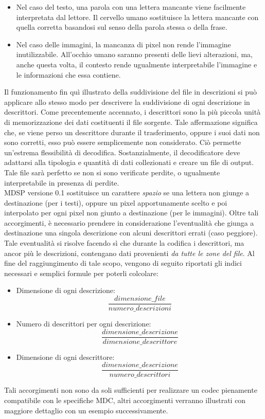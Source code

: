 \begin{itemize}
 \item Nel caso del testo, una parola con una lettera mancante viene facilmente interpretata dal lettore. Il cervello umano sostituisce la lettera mancante con quella corretta basandosi sul senso della parola stessa o della frase.
 \item Nel caso delle immagini, la mancanza di pixel non rende l'immagine inutilizzabile. All'occhio umano saranno presenti delle lievi alterazioni, ma, anche questa volta, il contesto rende ugualmente interpretabile l'immagine e le informazioni che essa contiene.
\end{itemize}
Il funzionamento fin qu\`i illustrato della suddivisione del file in descrizioni si pu\`o applicare allo stesso modo per descrivere la suddivisione di ogni descrizione in descrittori. Come precentemente accennato, i descrittori sono la pi\`u piccola unit\`a di memorizzazione dei dati costituenti il file sorgente. Tale affermazione significa che, se viene perso un descrittore durante il trasferimento, oppure i suoi dati non sono corretti, esso può essere semplicemente non considerato. Ci\`o permette un'estrema flessibilit\`a di decodifica. Sostanzialmente, il decodificatore deve adattarsi alla tipologia e quantit\`a di dati collezionati e creare un file di output. Tale file sar\`a perfetto se non si sono verificate perdite, o ugualmente interpretabile in presenza di perdite.
\\
MDSP versione 0.1 sostituisce un carattere \emph{spazio} se una lettera non giunge a destinazione (per i testi), oppure un pixel apportunamente scelto e poi interpolato per ogni pixel non giunto a destinazione (per le immagini). Oltre tali accorgimenti, è necessario prendere in considerazione l'eventualità che giunga a destinazione una singola descrizione con alcuni descrittori errati (caso peggiore). Tale eventualit\`a si risolve facendo s\`i che durante la codifica i descrittori, ma ancor pi\`u le descrizioni, contengano dati provenienti \emph{da tutte le zone del file}. Al fine del raggiungimento di tale scopo, vengono di seguito riportati gli indici necessari e semplici formule per poterli colcolare:
\begin{itemize}
 \item Dimensione di ogni descrizione: $$\frac{dimensione\_file}{numero\_descrizioni}$$
 \item Numero di descrittori per ogni descrizione: $$\frac{dimensione\_descrizione}{dimensione\_descrittore}$$
 \item Dimensione di ogni descrittore: $$\frac{dimensione\_descrizione}{numero\_descrittori}$$
\end{itemize}
Tali accorgimenti non sono da soli sufficienti per realizzare un codec pienamente compatibile con le specifiche MDC, altri accorgimenti verranno illustrati con maggiore dettaglio con un esempio successivamente.
